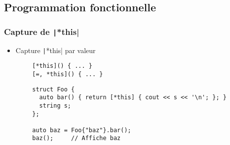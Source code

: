 \documentclass[C++.tex]{subfiles}
\begin{document}
\subsection*{Programmation fonctionnelle}
\begin{frame}[fragile]
	\frametitle{Capture de \texttt|*this|}
	\begin{itemize}
		\item Capture \texttt|*this| par valeur
	\end{itemize}

	\begin{verbatim}
		[*this]() { ... }
		[=, *this]() { ... }
	\end{verbatim}

	\begin{verbatim}
		struct Foo {
		  auto bar() { return [*this] { cout << s << '\n'; }; }
		  string s;
		};

		auto baz = Foo{"baz"}.bar();
		baz();     // Affiche baz
	\end{verbatim}


\end{frame}
\end{document}
